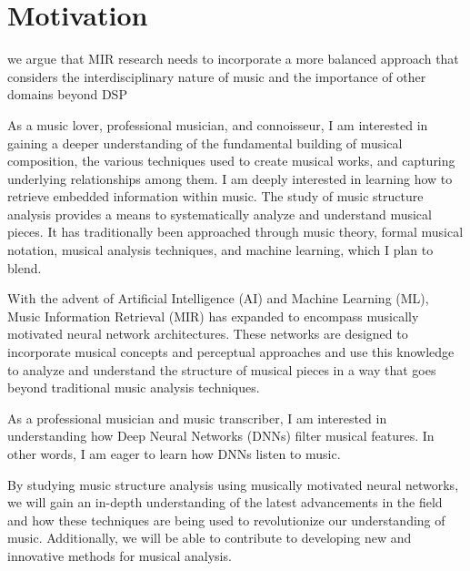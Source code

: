 \section{Motivation}

we argue that MIR research needs to incorporate a more balanced approach that considers the interdisciplinary nature of music and the importance of other domains beyond DSP

As a music lover, professional musician, and connoisseur, I am interested in gaining a deeper understanding of the fundamental building of musical composition, the various techniques used to create musical works, and capturing underlying relationships among them. I am deeply interested in learning how to retrieve embedded information within music. The study of music structure analysis provides a means to systematically analyze and understand musical pieces. It has traditionally been approached through music theory, formal musical notation, musical analysis techniques, and machine learning, which I plan to blend.

With the advent of Artificial Intelligence (AI) and Machine Learning (ML), Music Information Retrieval (MIR) has expanded to encompass musically motivated neural network architectures. These networks are designed to incorporate musical concepts and perceptual approaches and use this knowledge to analyze and understand the structure of musical pieces in a way that goes beyond traditional music analysis techniques.

As a professional musician and music transcriber, I am interested in understanding how Deep Neural Networks (DNNs) filter musical features. In other words, I am eager to learn how DNNs listen to music.

By studying music structure analysis using musically motivated neural networks, we will gain an in-depth understanding of the latest advancements in the field and how these techniques are being used to revolutionize our understanding of music. Additionally, we will be able to contribute to developing new and innovative methods for musical analysis.